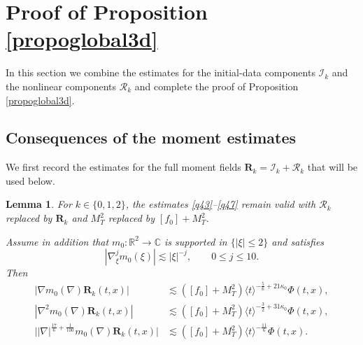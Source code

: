 \documentclass[reqno,11pt]{amsart}
\numberwithin{equation}{section}
\newtheorem{lemma}[theorem]{Lemma}
\begin{document}
\section{Proof of Proposition \ref{propoglobal3d}}
In this section we combine the estimates for the initial-data components
$\mathcal I_k$ and the nonlinear components $\mathcal R_k$ and complete the
proof of Proposition \ref{propoglobal3d}.
\subsection{Consequences of the moment estimates}

We first record the estimates for the full moment fields
$\mathbf R_k=\mathcal I_k+\mathcal R_k$ that will be used below.

\begin{lemma}\label{lem:full-moment-estimates}
For $k\in\{0,1,2\}$, the estimates \eqref{q43}--\eqref{q47} remain valid
with $\mathcal R_k$ replaced by $\mathbf R_k$ and $M_T^2$ replaced by
$[f_0]+M_T^2$.

Assume in addition that $m_0:\mathbb R^2\to\mathbb C$ is supported in
$\{|\xi|\leq2\}$ and satisfies
\begin{equation}\label{sec5eq2}
|\nabla_\xi^j m_0(\xi)|\lesssim |\xi|^{-j},
\qquad 0\leq j\leq10.
\end{equation}
Then
\begin{align}
|\nabla m_0(\nabla)\mathbf R_k(t,x)|
&\lesssim ([f_0]+M_T^2)
\langle t\rangle^{-\frac56+21\kappa_0}\Phi(t,x),
\label{q44b}\\
|\nabla^2m_0(\nabla)\mathbf R_k(t,x)|
&\lesssim ([f_0]+M_T^2)
\langle t\rangle^{-\frac32+31\kappa_0}\Phi(t,x),
\label{q45b}\\
\big||\nabla|^{\frac{17}{6}+\frac1{100}}
m_0(\nabla)\mathbf R_k(t,x)\big|
&\lesssim ([f_0]+M_T^2)
\langle t\rangle^{-\frac{11}{6}}\Phi(t,x).
\label{q46b}
\end{align}
\end{lemma}
\end{document}
